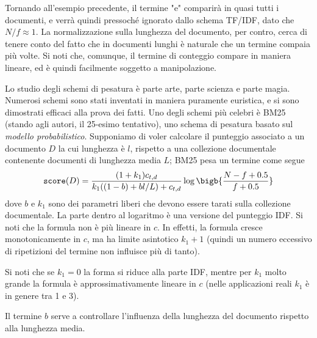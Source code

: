 Tornando all'esempio precedente, il termine "e" comparirà in quasi tutti i documenti, e verrà quindi pressoché ignorato dallo schema TF/IDF, dato che $N / f \approx 1$. La normalizzazione sulla lunghezza del documento, per contro, cerca di tenere conto del fatto che in documenti lunghi è naturale che un termine compaia più volte. Si noti che, comunque, il termine di conteggio compare in maniera lineare, ed è quindi facilmente soggetto a manipolazione.

Lo studio degli schemi di pesatura è parte arte, parte scienza e parte magia. Numerosi schemi sono stati inventati in maniera puramente euristica, e si sono dimostrati efficaci alla prova dei fatti. Uno degli schemi più celebri è BM25 (stando agli autori, il 25-esimo tentativo), uno schema di pesatura basato sul \textit{modello probabilistico}. Supponiamo di voler calcolare il punteggio associato a un documento $D$ la cui lunghezza è $l$, rispetto a una collezione documentale contenente documenti di lunghezza media $L$; BM25 pesa un termine come segue
\begin{equation*}
    \texttt{score}(D) = \frac{(1 + k_1)c_{t, d}}{k_1((1 - b) + bl / L) + c_{t, d}}\log\bigb{\frac{N - f + 0.5}{f + 0.5}}
\end{equation*}
dove $b$ e $k_1$ sono dei parametri liberi che devono essere tarati sulla collezione documentale. La parte dentro al logaritmo è una versione del punteggio IDF. Si noti che la formula non è più lineare in $c$. In effetti, la formula cresce monotonicamente in $c$, ma ha limite asintotico $k_1 + 1$ (quindi un numero eccessivo di ripetizioni del termine non influisce più di tanto).

Si noti che se $k_1 = 0$ la forma si riduce alla parte IDF, mentre per $k_1$ molto grande la formula è approssimativamente lineare in $c$ (nelle applicazioni reali $k_1$ è in genere tra 1 e 3).

Il termine $b$ serve a controllare l'influenza della lunghezza del documento rispetto alla lunghezza media.
